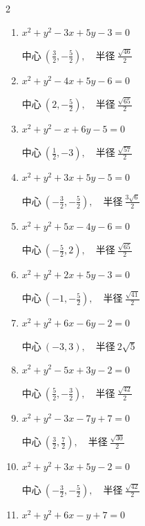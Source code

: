 \begin{multicols}{2}
\begin{enumerate}
  \item $x^{2}+y^{2}-3x+5y-3=0$

        $\displaystyle 中心\: \left(\frac{3}{2},-\frac{5}{2}\right), \quad 半径 \ \frac{\sqrt{46}}{2}$

  \item $x^{2}+y^{2}-4x+5y-6=0$

        $\displaystyle 中心\: \left(2,-\frac{5}{2}\right), \quad 半径 \ \frac{\sqrt{65}}{2}$

  \item $x^{2}+y^{2}-x+6y-5=0$

        $\displaystyle 中心\: \left(\frac{1}{2},-3\right), \quad 半径 \ \frac{\sqrt{57}}{2}$

  \item $x^{2}+y^{2}+3x+5y-5=0$

        $\displaystyle 中心\: \left(-\frac{3}{2},-\frac{5}{2}\right), \quad 半径 \ \frac{3\sqrt{6}}{2}$

  \item $x^{2}+y^{2}+5x-4y-6=0$

        $\displaystyle 中心\: \left(-\frac{5}{2},2\right), \quad 半径 \ \frac{\sqrt{65}}{2}$

  \item $x^{2}+y^{2}+2x+5y-3=0$

        $\displaystyle 中心\: \left(-1,-\frac{5}{2}\right), \quad 半径 \ \frac{\sqrt{41}}{2}$

  \item $x^{2}+y^{2}+6x-6y-2=0$

        $\displaystyle 中心\: \left(-3,3\right), \quad 半径 \ 2\sqrt{5}$

  \item $x^{2}+y^{2}-5x+3y-2=0$

        $\displaystyle 中心\: \left(\frac{5}{2},-\frac{3}{2}\right), \quad 半径 \ \frac{\sqrt{42}}{2}$

  \item $x^{2}+y^{2}-3x-7y+7=0$

        $\displaystyle 中心\: \left(\frac{3}{2},\frac{7}{2}\right), \quad 半径 \ \frac{\sqrt{30}}{2}$

  \item $x^{2}+y^{2}+3x+5y-2=0$

        $\displaystyle 中心\: \left(-\frac{3}{2},-\frac{5}{2}\right), \quad 半径 \ \frac{\sqrt{42}}{2}$

  \item $x^{2}+y^{2}+6x-y+7=0$


\end{enumerate}
\end{multicols}
